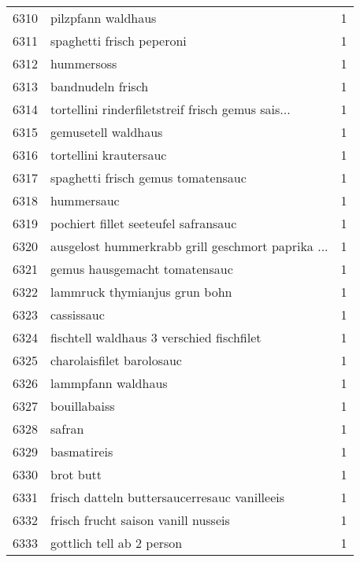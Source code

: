 \begin{tabular}{llr}
6310 &                                 pilzpfann waldhaus &      1 \\
6311 &                          spaghetti frisch peperoni &      1 \\
6312 &                                         hummersoss &      1 \\
6313 &                                  bandnudeln frisch &      1 \\
6314 &  tortellini rinderfiletstreif frisch gemus sais... &      1 \\
6315 &                                gemusetell waldhaus &      1 \\
6316 &                             tortellini krautersauc &      1 \\
6317 &                 spaghetti frisch gemus tomatensauc &      1 \\
6318 &                                         hummersauc &      1 \\
6319 &               pochiert fillet seeteufel safransauc &      1 \\
6320 &  ausgelost hummerkrabb grill geschmort paprika ... &      1 \\
6321 &                      gemus hausgemacht tomatensauc &      1 \\
6322 &                      lammruck thymianjus grun bohn &      1 \\
6323 &                                         cassissauc &      1 \\
6324 &          fischtell waldhaus 3 verschied fischfilet &      1 \\
6325 &                          charolaisfilet barolosauc &      1 \\
6326 &                                 lammpfann waldhaus &      1 \\
6327 &                                       bouillabaiss &      1 \\
6328 &                                             safran &      1 \\
6329 &                                        basmatireis &      1 \\
6330 &                                          brot butt &      1 \\
6331 &       frisch datteln buttersaucerresauc vanilleeis &      1 \\
6332 &                frisch frucht saison vanill nusseis &      1 \\
6333 &                          gottlich tell ab 2 person &      1 \\

\end{tabular}
